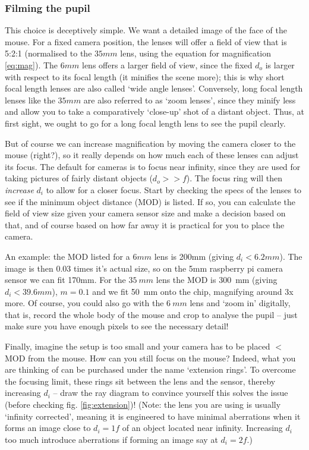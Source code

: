 \documentclass[a4paper]{report}
\begin{document}
	\subsubsection{Filming the pupil}
	This choice is deceptively simple. We want a detailed image of the face of the mouse.
	For a fixed camera position, the lenses will offer a field of view that is 5:2:1 (normalised to the $35mm$ lens, using the equation for magnification \ref{eq:mag}).
	The $6mm$ lens offers a larger field of view, since the fixed $d_o$ is larger with respect to its focal length (it minifies the scene more); this is why short focal length lenses are also called `wide angle lenses'.
	Conversely, long focal length lenses like the $35mm$ are also referred to as `zoom lenses', since they minify less and allow you to take a comparatively `close-up' shot of a distant object.
	Thus, at first sight, we ought to go for a long focal length lens to see the pupil clearly.


	But of course we can increase magnification by moving the camera closer to the mouse (right?), so it really depends on how much each of these lenses can adjust its focus.
	The default for cameras is to focus near infinity, since they are used for taking pictures of fairly distant objects ($d_o>>f$).
	The focus ring will then \emph{increase} $d_i$ to allow for a closer focus.
	Start by checking the specs of the lenses to see if the minimum object distance (MOD) is listed.
	If so, you can calculate the field of view size given your camera sensor size and make a decision based on that, and of course based on how far away it is practical for you to place the camera.


	An example: the MOD listed for a $6mm$ lens is 200mm (giving $d_i<6.2mm$).
	The image is then 0.03 times it's actual size, so on the 5mm raspberry pi camera sensor we can fit 170mm.
	For the $35~mm$ lens the MOD is 300~mm (giving $d_i<39.6mm$), $m=0.1$ and we fit 50~mm onto the chip, magnifying around 3x more.
	Of course, you could also go with the $6~mm$ lens and `zoom in' digitally, that is, record the whole body of the mouse and crop to analyse the pupil -- just make sure you have enough pixels to see the necessary detail!


	Finally, imagine the setup is too small and your camera has to be placed $<$MOD from the mouse.
	How can you still focus on the mouse? Indeed, what you are thinking of can be purchased under the name `extension rings'.
	To overcome the focusing limit, these rings sit between the lens and the sensor, thereby increasing $d_i$ -- draw the ray diagram to convince yourself this solves the issue (before checking fig. \ref{fig:extension})! (Note: the lens you are using is usually `infinity corrected', meaning it is engineered to have minimal aberrations when it forms an image close to $d_i=1f$ of an object located near infinity.
	Increasing $d_i$ too much introduce aberrations if forming an image say at $d_i=2f$.)
\end{document}
